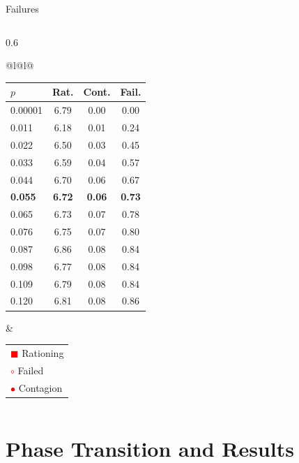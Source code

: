 \begin{frame}{Failures}
\begin{columns}[T]
\begin{column}{0.6\textwidth}
\begin{figure}
      \end{figure}
      \vspace{-0.4cm}
      \renewcommand{\arraystretch}{0.55}\setlength{\tabcolsep}{1.2pt}
      \centering
      \tiny
      \begin{tabular}{@{}l@{\hspace{0.15cm}}l@{}}
        \begin{tabular}{lccc}
          \toprule
          $p$ & Rat. & Cont. & Fail. \\
          \midrule
          0.00001 & 6.79 & 0.00 & 0.00 \\
          0.011 & 6.18 & 0.01 & 0.24 \\
          0.022 & 6.50 & 0.03 & 0.45 \\
          0.033 & 6.59 & 0.04 & 0.57 \\
          0.044 & 6.70 & 0.06 & 0.67 \\
           \textbf{0.055} &  \textbf{6.72} &  \textbf{0.06} &  \textbf{0.73} \\
          0.065 & 6.73 & 0.07 & 0.78 \\
          0.076 & 6.75 & 0.07 & 0.80 \\
          0.087 & 6.86 & 0.08 & 0.84 \\
          0.098 & 6.77 & 0.08 & 0.84 \\
          0.109 & 6.79 & 0.08 & 0.84 \\
          0.120 & 6.81 & 0.08 & 0.86 \\
          \bottomrule
        \end{tabular}
        &
        \begin{tabular}{l}
          \textcolor{red}{$\blacksquare$} Rationing \\
          \textcolor{red}{$\circ$} Failed \\
          \textcolor{red}{$\bullet$} Contagion
        \end{tabular}
      \end{tabular}
    \end{column}
  \end{columns}
\end{frame}


\section{Phase Transition and Results}\label{sec:6}

